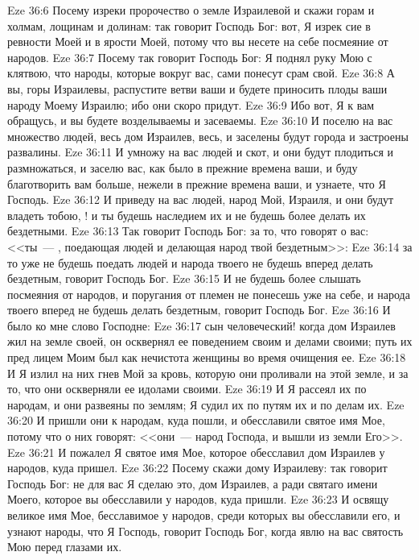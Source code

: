 \vs Eze 36:6 Посему изреки пророчество о земле Израилевой и скажи горам и холмам, лощинам и долинам: так говорит Господь Бог: вот, Я изрек сие в ревности Моей и в ярости Моей, потому что вы несете на себе посмеяние от народов.
\vs Eze 36:7 Посему так говорит Господь Бог: Я поднял руку Мою с клятвою, что народы, которые вокруг вас, сами понесут срам свой.
\vs Eze 36:8 А вы, горы Израилевы, распустите ветви ваши и будете приносить плоды ваши народу Моему Израилю; ибо они скоро придут.
\vs Eze 36:9 Ибо вот, Я к вам обращусь, и вы будете возделываемы и засеваемы.
\vs Eze 36:10 И поселю на вас множество людей, весь дом Израилев, весь, и заселены будут города и застроены развалины.
\vs Eze 36:11 И умножу на вас людей и скот, и они будут плодиться и размножаться, и заселю вас, как было в прежние времена ваши, и буду благотворить вам больше, нежели в прежние времена ваши, и узнаете, что Я Господь.
\vs Eze 36:12 И приведу на вас людей, народ Мой, Израиля, и они будут владеть тобою, ! и ты будешь наследием их и не будешь более делать их бездетными.
\vs Eze 36:13 Так говорит Господь Бог: за то, что говорят о вас: <<ты~--- , поедающая людей и делающая народ твой бездетным>>:
\vs Eze 36:14 за то уже не будешь поедать людей и народа твоего не будешь вперед делать бездетным, говорит Господь Бог.
\vs Eze 36:15 И не будешь более слышать посмеяния от народов, и поругания от племен не понесешь уже на себе, и народа твоего вперед не будешь делать бездетным, говорит Господь Бог.
\rsbpar\vs Eze 36:16 И было ко мне слово Господне:
\vs Eze 36:17 сын человеческий! когда дом Израилев жил на земле своей, он осквернял ее поведением своим и делами своими; путь их пред лицем Моим был как нечистота женщины во время очищения ее.
\vs Eze 36:18 И Я излил на них гнев Мой за кровь, которую они проливали на этой земле, и за то, что они оскверняли ее идолами своими.
\vs Eze 36:19 И Я рассеял их по народам, и они развеяны по землям; Я судил их по путям их и по делам их.
\vs Eze 36:20 И пришли они к народам, куда пошли, и обесславили святое имя Мое, потому что о них говорят: <<они~--- народ Господа, и вышли из земли Его>>.
\vs Eze 36:21 И пожалел Я святое имя Мое, которое обесславил дом Израилев у народов, куда пришел.
\vs Eze 36:22 Посему скажи дому Израилеву: так говорит Господь Бог: не для вас Я сделаю это, дом Израилев, а ради святаго имени Моего, которое вы обесславили у народов, куда пришли.
\vs Eze 36:23 И освящу великое имя Мое, бесславимое у народов, среди которых вы обесславили его, и узнают народы, что Я Господь, говорит Господь Бог, когда явлю на вас святость Мою перед глазами их.
